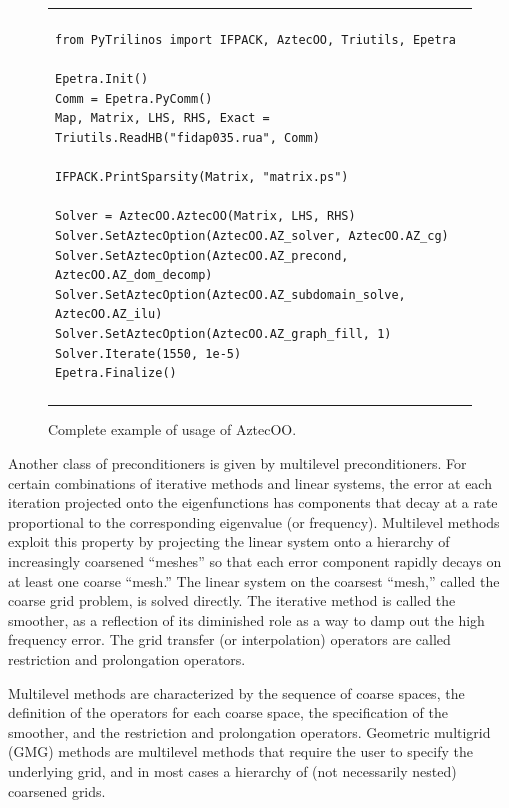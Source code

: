 \documentclass[acmtocl]{acmtrans2m}
\begin{document}
\begin{figure}
  \begin{center}
    \begin{tabular}{| p{12cm} |}
      \hline
      \\
      \footnotesize
      \begin{minipage}{11.5cm}
\begin{verbatim}
from PyTrilinos import IFPACK, AztecOO, Triutils, Epetra

Epetra.Init()
Comm = Epetra.PyComm()
Map, Matrix, LHS, RHS, Exact = Triutils.ReadHB("fidap035.rua", Comm)

IFPACK.PrintSparsity(Matrix, "matrix.ps")

Solver = AztecOO.AztecOO(Matrix, LHS, RHS)
Solver.SetAztecOption(AztecOO.AZ_solver, AztecOO.AZ_cg)
Solver.SetAztecOption(AztecOO.AZ_precond, AztecOO.AZ_dom_decomp)
Solver.SetAztecOption(AztecOO.AZ_subdomain_solve, AztecOO.AZ_ilu)
Solver.SetAztecOption(AztecOO.AZ_graph_fill, 1)
Solver.Iterate(1550, 1e-5)
Epetra.Finalize()
\end{verbatim}
      \end{minipage}
      \\
      \\
      \hline
    \end{tabular}
    \caption{Complete example of usage of AztecOO.}
    \label{fig:aztecoo}
  \end{center}
\end{figure}

\medskip

Another class of preconditioners is given by multilevel
preconditioners.  For certain combinations of iterative methods and
linear systems, the error at each iteration projected onto the
eigenfunctions has components that decay at a rate proportional to the
corresponding eigenvalue (or frequency).  Multilevel methods exploit
this property \cite{Briggs} by projecting the linear system onto a
hierarchy of increasingly coarsened ``meshes'' so that each error
component rapidly decays on at least one coarse ``mesh.''  The linear
system on the coarsest ``mesh,'' called the coarse grid problem, is
solved directly.  The iterative method is called the smoother, as a
reflection of its diminished role as a way to damp out the high
frequency error.  The grid transfer (or interpolation) operators are
called restriction and prolongation operators.

Multilevel methods are characterized by the sequence of coarse spaces,
the definition of the operators for each coarse space, the
specification of the smoother, and the restriction and prolongation
operators.  Geometric multigrid (GMG) methods are multilevel methods
that require the user to specify the underlying grid, and in most
cases a hierarchy of (not necessarily nested) coarsened grids.
\end{document}
